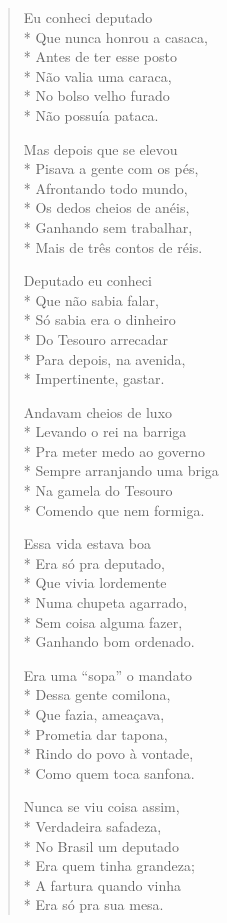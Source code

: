 \begin{verse}
Eu conheci deputado\\*
Que nunca honrou a casaca,\\*
Antes de ter esse posto\\*
Não valia uma caraca,\\*
No bolso velho furado\\*
Não possuía pataca.

Mas depois que se elevou\\*
Pisava a gente com os pés, \\*
Afrontando todo mundo,\\*
Os dedos cheios de anéis,\\*
Ganhando sem trabalhar,\\*
Mais de três contos de réis.

Deputado eu conheci\\*
Que não sabia falar,\\*
Só sabia era o dinheiro\\*
Do Tesouro arrecadar\\*
Para depois, na avenida,\\*
Impertinente, gastar.

Andavam cheios de luxo\\*
Levando o rei na barriga\\*
Pra meter medo ao governo\\*
Sempre arranjando uma briga\\*
Na gamela do Tesouro\\*
Comendo que nem formiga.

Essa vida estava boa\\*
Era só pra deputado,\\*
Que vivia lordemente\\*
Numa chupeta agarrado,\\*
Sem coisa alguma fazer,\\*
Ganhando bom ordenado.

Era uma “sopa” o mandato\\*
Dessa gente comilona,\\*
Que fazia, ameaçava,\\*
Prometia dar tapona,\\*
Rindo do povo à vontade,\\*
Como quem toca sanfona.

Nunca se viu coisa assim,\\*
Verdadeira safadeza,\\*
No Brasil um deputado\\*
Era quem tinha grandeza;\\*
A fartura quando vinha\\*
Era só pra sua mesa.


\end{verse}

